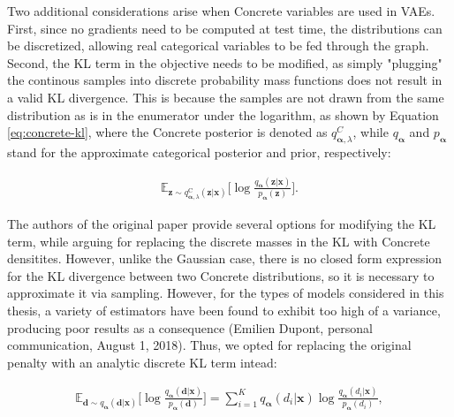 \documentclass{report}
\begin{document}
\bigskip

\noindent Two additional considerations arise when Concrete variables are used in VAEs. First, since no gradients need to be computed at test time, the distributions can be discretized, allowing real categorical variables to be fed through the graph. Second, the KL term in the objective needs to be modified, as simply "plugging" the continous samples into discrete probability mass functions does not result in a valid KL divergence. This is because the samples are not drawn from the same distribution as is in the enumerator under the logarithm, as shown by Equation \ref{eq:concrete-kl}, where the Concrete posterior is denoted as $q_{\boldsymbol{\alpha}, \lambda}^C$, while $q_{\boldsymbol{\alpha}}$ and $p_{\boldsymbol{\alpha}}$ stand for the approximate categorical posterior and prior, respectively:

\begin{equation}
\begin{gathered}
\mathbb{E}_{\boldsymbol{z} \sim q^{\text{C}}_{\boldsymbol{\alpha}, \lambda}(\boldsymbol{z} | \boldsymbol{x})} \Big[ \log \frac{q_{\boldsymbol{\alpha}}(\boldsymbol{z} | \boldsymbol{x})}{p_{\boldsymbol{\alpha}} (\boldsymbol{z})} \Big].
\end{gathered}
\label{eq:concrete-kl}
\end{equation}

\bigskip

\noindent The authors of the original paper \cite{concrete} provide several options for modifying the KL term, while arguing for replacing the discrete masses in the KL with Concrete densitites. However, unlike the Gaussian case, there is no closed form expression for the KL divergence between two Concrete distributions, so it is necessary to approximate it via sampling. However, for the types of models considered in this thesis, a variety of estimators have been found to exhibit too high of a variance, producing poor results as a consequence (Emilien Dupont, personal communication, August 1, 2018). Thus, we opted for replacing the original penalty with an analytic discrete KL term intead:

\begin{equation}
\begin{gathered}
\mathbb{E}_{\boldsymbol{d} \sim q_{\boldsymbol{\alpha}}(\boldsymbol{d} | \boldsymbol{x})} \Big[ \log \frac{q_{\boldsymbol{\alpha}}(\boldsymbol{d} | \boldsymbol{x})}{p_{\boldsymbol{\alpha}} (\boldsymbol{d})} \Big] = \sum_{i=1}^K q_{\boldsymbol{\alpha}}(d_i | \boldsymbol{x}) \log \frac{q_{\boldsymbol{\alpha}}(d_i | \boldsymbol{x})}{p_{\boldsymbol{\alpha}}(d_i)},
\end{gathered}
\label{eq:analytic-discrete-kl}
\end{equation}
\end{document}
